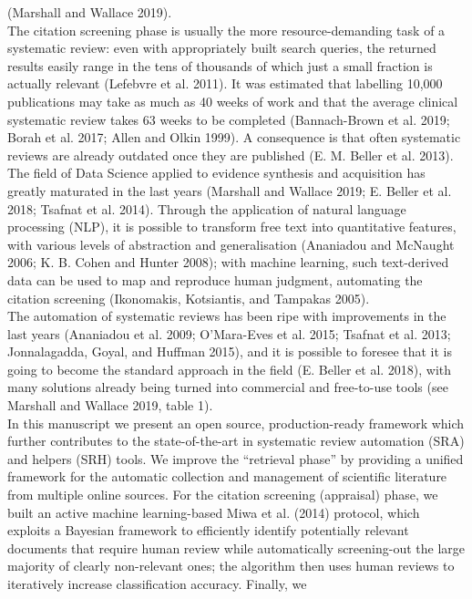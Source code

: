 \documentclass{article}
\begin{document}
(Marshall and Wallace 2019).\\
The citation screening phase is usually the more resource-demanding task
of a systematic review: even with appropriately built search queries,
the returned results easily range in the tens of thousands of which just
a small fraction is actually relevant (Lefebvre et al. 2011). It was
estimated that labelling 10,000 publications may take as much as 40
weeks of work and that the average clinical systematic review takes 63
weeks to be completed (Bannach-Brown et al. 2019; Borah et al. 2017;
Allen and Olkin 1999). A consequence is that often systematic reviews
are already outdated once they are published (E. M. Beller et al.
2013).\\
The field of Data Science applied to evidence synthesis and acquisition
has greatly maturated in the last years (Marshall and Wallace 2019; E.
Beller et al. 2018; Tsafnat et al. 2014). Through the application of
natural language processing (NLP), it is possible to transform free text
into quantitative features, with various levels of abstraction and
generalisation (Ananiadou and McNaught 2006; K. B. Cohen and Hunter
2008); with machine learning, such text-derived data can be used to map
and reproduce human judgment, automating the citation screening
(Ikonomakis, Kotsiantis, and Tampakas 2005).\\
The automation of systematic reviews has been ripe with improvements in
the last years (Ananiadou et al. 2009; O'Mara-Eves et al. 2015; Tsafnat
et al. 2013; Jonnalagadda, Goyal, and Huffman 2015), and it is possible
to foresee that it is going to become the standard approach in the field
(E. Beller et al. 2018), with many solutions already being turned into
commercial and free-to-use tools (see Marshall and Wallace 2019, table
1).\\
In this manuscript we present an open source, production-ready framework
which further contributes to the state-of-the-art in systematic review
automation (SRA) and helpers (SRH) tools. We improve the ``retrieval
phase'' by providing a unified framework for the automatic collection
and management of scientific literature from multiple online sources.
For the citation screening (appraisal) phase, we built an active machine
learning-based Miwa et al. (2014) protocol, which exploits a Bayesian
framework to efficiently identify potentially relevant documents that
require human review while automatically screening-out the large
majority of clearly non-relevant ones; the algorithm then uses human
reviews to iteratively increase classification accuracy. Finally, we
\end{document}
